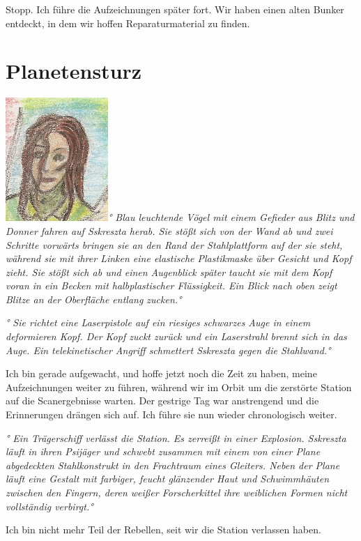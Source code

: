\documentclass[11pt]{article}
\begin{document}
Stopp. Ich führe die Aufzeichnungen später fort. Wir haben einen alten
Bunker entdeckt, in dem wir hoffen Reparaturmaterial zu finden.

\section{Planetensturz}

\includegraphics{sskreszta-portrait-alt-klein.png}\emph{° Blau
leuchtende Vögel mit einem Gefieder aus Blitz und Donner fahren auf
Sskreszta herab. Sie stößt sich von der Wand ab und zwei Schritte
vorwärts bringen sie an den Rand der Stahlplattform auf der sie steht,
während sie mit ihrer Linken eine elastische Plastikmaske über Gesicht
und Kopf zieht. Sie stößt sich ab und einen Augenblick später taucht sie
mit dem Kopf voran in ein Becken mit halbplastischer Flüssigkeit. Ein
Blick nach oben zeigt Blitze an der Oberfläche entlang zucken.°}

\emph{° Sie richtet eine Laserpistole auf ein riesiges schwarzes Auge in
einem deformieren Kopf. Der Kopf zuckt zurück und ein Laserstrahl brennt
sich in das Auge. Ein telekinetischer Angriff schmettert Sskreszta gegen
die Stahlwand.°}

Ich bin gerade aufgewacht, und hoffe jetzt noch die Zeit zu haben, meine
Aufzeichnungen weiter zu führen, während wir im Orbit um die zerstörte
Station auf die Scanergebnisse warten. Der gestrige Tag war anstrengend
und die Erinnerungen drängen sich auf. Ich führe sie nun wieder
chronologisch weiter.

\emph{° Ein Trägerschiff verlässt die Station. Es zerreißt in einer
Explosion. Sskreszta läuft in ihren Psijäger und schwebt zusammen mit
einem von einer Plane abgedeckten Stahlkonstrukt in den Frachtraum eines
Gleiters. Neben der Plane läuft eine Gestalt mit farbiger, feucht
glänzender Haut und Schwimmhäuten zwischen den Fingern, deren weißer
Forscherkittel ihre weiblichen Formen nicht vollständig verbirgt.°}

Ich bin nicht mehr Teil der Rebellen, seit wir die Station verlassen
haben.
\end{document}
